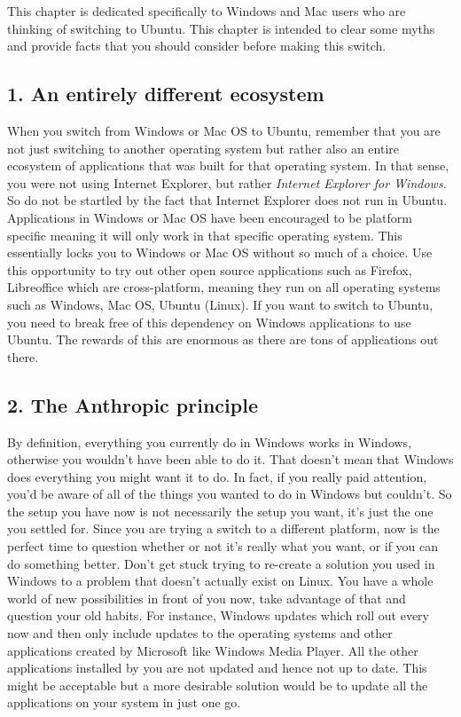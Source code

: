 This chapter is dedicated specifically to Windows and Mac users who are thinking of switching to Ubuntu. This chapter is intended to clear some myths and provide facts that you should consider before making this switch. 

\subsection*{1. An entirely different ecosystem}
When you switch from Windows or Mac OS to Ubuntu, remember that you are not just switching to another operating system but rather also an entire ecosystem of applications that was built for that operating system. In that sense, you were not using Internet Explorer, but rather \emph{Internet Explorer for Windows}. So do not be startled by the fact that Internet Explorer does not run in Ubuntu. Applications in Windows or Mac OS have been encouraged to be platform specific meaning it will only work in that specific operating system. This essentially locks you to Windows or Mac OS without so much of a choice. Use this opportunity to try out other open source applications such as Firefox, Libreoffice which are cross-platform, meaning they run on all operating systems such as Windows, Mac OS, Ubuntu (Linux). If you want to switch to Ubuntu, you need to break free of this dependency on Windows applications to use Ubuntu. The rewards of this are enormous as there are tons of applications out there.

\subsection*{2. The Anthropic principle}
By definition, everything you currently do in Windows works in Windows, otherwise you wouldn't have been able to do it. That doesn't mean that Windows does everything you might want it to do. In fact, if you really paid attention, you'd be aware of all of the things you wanted to do in Windows but couldn't. So the setup you have now is not necessarily the setup you want, it's just the one you settled for.  Since you are trying a switch to a different platform, now is the perfect time to question whether or not it's really what you want, or if you can do something better. Don't get stuck trying to re-create a solution you  used in Windows to a problem that doesn't actually exist on Linux. You have a whole world of new possibilities in front of you now, take advantage of that and question your old habits. For instance, Windows updates which roll out every now and then only include updates to the operating systems and other applications created by Microsoft like Windows Media Player. All the other applications installed by you are not updated and hence not up to date. This might be acceptable but a more desirable solution would be to update all the applications on your system in just one go. 

